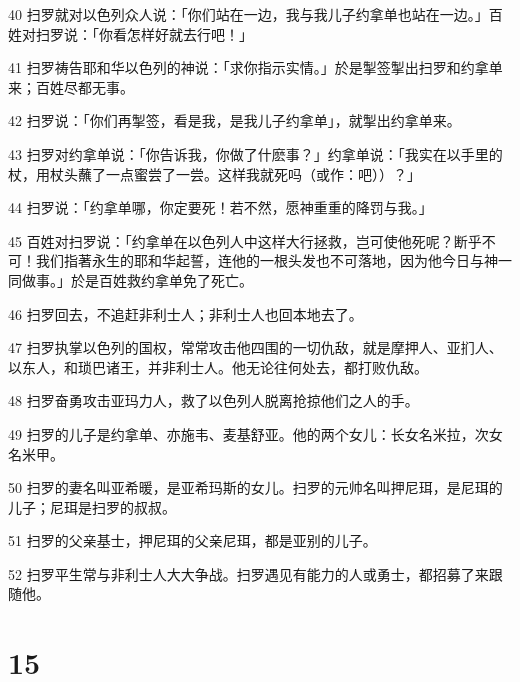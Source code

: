 \par 40 扫罗就对以色列众人说：「你们站在一边，我与我儿子约拿单也站在一边。」百姓对扫罗说：「你看怎样好就去行吧！」
\par 41 扫罗祷告耶和华以色列的神说：「求你指示实情。」於是掣签掣出扫罗和约拿单来；百姓尽都无事。
\par 42 扫罗说：「你们再掣签，看是我，是我儿子约拿单」，就掣出约拿单来。
\par 43 扫罗对约拿单说：「你告诉我，你做了什麽事？」约拿单说：「我实在以手里的杖，用杖头蘸了一点蜜尝了一尝。这样我就死吗（或作：吧））？」
\par 44 扫罗说：「约拿单哪，你定要死！若不然，愿神重重的降罚与我。」
\par 45 百姓对扫罗说：「约拿单在以色列人中这样大行拯救，岂可使他死呢？断乎不可！我们指著永生的耶和华起誓，连他的一根头发也不可落地，因为他今日与神一同做事。」於是百姓救约拿单免了死亡。
\par 46 扫罗回去，不追赶非利士人；非利士人也回本地去了。
\par 47 扫罗执掌以色列的国权，常常攻击他四围的一切仇敌，就是摩押人、亚扪人、以东人，和琐巴诸王，并非利士人。他无论往何处去，都打败仇敌。
\par 48 扫罗奋勇攻击亚玛力人，救了以色列人脱离抢掠他们之人的手。
\par 49 扫罗的儿子是约拿单、亦施韦、麦基舒亚。他的两个女儿：长女名米拉，次女名米甲。
\par 50 扫罗的妻名叫亚希暖，是亚希玛斯的女儿。扫罗的元帅名叫押尼珥，是尼珥的儿子；尼珥是扫罗的叔叔。
\par 51 扫罗的父亲基士，押尼珥的父亲尼珥，都是亚别的儿子。
\par 52 扫罗平生常与非利士人大大争战。扫罗遇见有能力的人或勇士，都招募了来跟随他。

\chapter{15}

